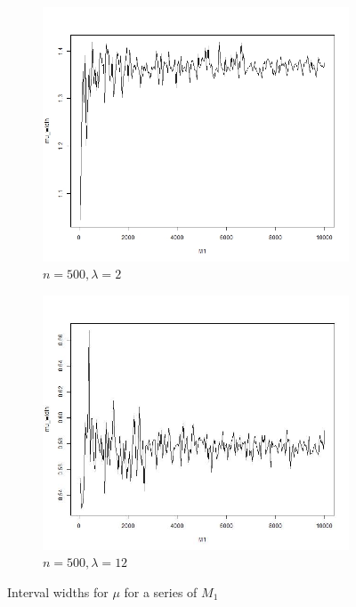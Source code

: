 \documentclass{article}
\begin{document}
\begin{figure}[!htb]
    	\begin{subfigure}[b]{0.5\textwidth}
    	\includegraphics[width = \textwidth]{./Codes/mu_500_2.jpg}
    	\caption{$n = 500, \lambda = 2$}
    	\end{subfigure}%
    	\begin{subfigure}[b]{0.5\textwidth}
    	\includegraphics[width = \textwidth]{./Codes/mu_500_12.jpg}
    	\caption{$n = 500, \lambda = 12$}
    	\end{subfigure}
    	\caption{Interval widths for $\mu$ for a series of $M_1$}
    	\label{chooseM1_mu}
    \end{figure}
\end{document}

